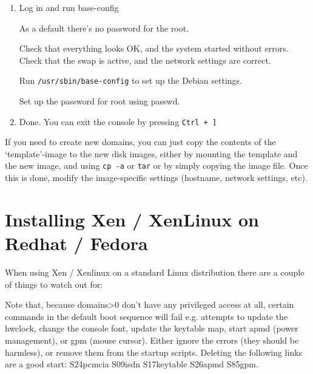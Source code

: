 \documentclass[11pt,twoside,final,openright]{xenstyle}
\begin{document}
{\begin{enumerate}
        There you can see the ID of the console: 26. You can also list
        the consoles with {\tt xm consoles"}. (ID is the last two
        digits of the portnumber.)

        Attach to the console:

\begin{verbatim}
xm console 26
\end{verbatim}

        or by telnetting to the port 9626 of localhost (the xm console
        progam works better).

\item   Log in and run base-config

        As a default there's no password for the root.

        Check that everything looks OK, and the system started without
        errors.  Check that the swap is active, and the network settings are
        correct.

        Run {\tt /usr/sbin/base-config} to set up the Debian settings.

        Set up the password for root using passwd.

\item     Done. You can exit the console by pressing {\tt Ctrl + ]}

\end{enumerate}

If you need to create new domains, you can just copy the contents of
the `template'-image to the new disk images, either by mounting the
template and the new image, and using {\tt cp -a} or {\tt tar} or by
simply copying the image file.  Once this is done, modify the
image-specific settings (hostname, network settings, etc).

\chapter{Installing Xen / XenLinux on Redhat / Fedora}

When using Xen / Xenlinux on a standard Linux distribution there are
a couple of things to watch out for:

Note that, because domains>0 don't have any privileged access at all,
certain commands in the default boot sequence will fail e.g. attempts
to update the hwclock, change the console font, update the keytable
map, start apmd (power management), or gpm (mouse cursor).  Either
ignore the errors (they should be harmless), or remove them from the
startup scripts.  Deleting the following links are a good start:
S24pcmcia S09isdn S17keytable S26apmd S85gpm.

}
\end{document}
